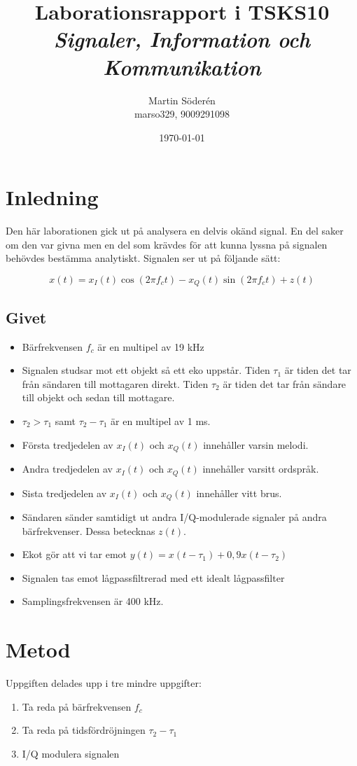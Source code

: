 \documentclass[10pt,twocolumn]{article}
\title{Laborationsrapport i TSKS10 \emph{Signaler, Information och Kommunikation}}
\author{Martin Söderén \\ marso329, 9009291098 }
\date{\today}
\begin{document}
\maketitle

\section{Inledning}

Den här laborationen gick ut på analysera en delvis okänd signal. En del saker om den var givna men en del som krävdes för att kunna lyssna på signalen behövdes bestämma analytiskt. Signalen ser ut på följande sätt:

$$x(t)=x_I(t)\cos(2\pi f_c t)-x_Q(t)\sin(2\pi f_c t)+z(t)$$


\subsection{Givet}
\begin{itemize}
\item Bärfrekvensen $f_c$ är en multipel av 19 kHz
\item Signalen studsar mot ett objekt så ett eko uppstår. Tiden $\tau_1$ är tiden det tar från sändaren till mottagaren direkt. Tiden $\tau_2$ är tiden det tar från sändare till objekt och sedan till mottagare.
\item $\tau_2>\tau_1$ samt $\tau_2-\tau_1$ är en multipel av 1 ms. 
\item Första tredjedelen av $x_I(t)$ och $x_Q(t)$ innehåller varsin melodi.
\item Andra tredjedelen av $x_I(t)$ och $x_Q(t)$ innehåller varsitt ordspråk.
\item Sista tredjedelen av $x_I(t)$ och $x_Q(t)$ innehåller vitt brus.
\item Sändaren sänder samtidigt ut andra I/Q-modulerade signaler på andra bärfrekvenser. Dessa betecknas $z(t)$. 
\item Ekot gör att vi tar emot $y(t)=x(t-\tau_1)+0,9x(t-\tau_2)$
\item Signalen tas emot lågpassfiltrerad med ett idealt lågpassfilter
\item Samplingsfrekvensen är 400 kHz.
\end{itemize}

\section{Metod}

Uppgiften delades upp i tre mindre uppgifter: 
\begin{enumerate}
\item Ta reda på bärfrekvensen $f_c$
\item Ta reda på tidsfördröjningen $\tau_2-\tau_1$
\item I/Q modulera signalen
\end{enumerate}
\end{document}
